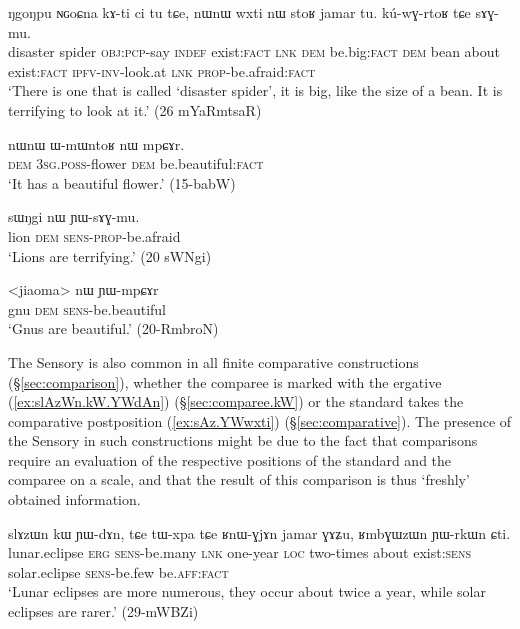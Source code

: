  \begin{exe}
\ex \label{ex:sAGmu}
\gll  ŋgoŋpu ɴɢoɕna kɤ-ti ci tu tɕe, nɯnɯ wxti nɯ stoʁ jamar tu. kú-wɣ-rtoʁ tɕe sɤɣ-mu. \\
disaster spider \textsc{obj}:\textsc{pcp}-say \textsc{indef} exist:\textsc{fact} \textsc{lnk} \textsc{dem} be.big:\textsc{fact}  \textsc{dem} bean about exist:\textsc{fact} \textsc{ipfv}-\textsc{inv}-look.at \textsc{lnk} \textsc{prop}-be.afraid:\textsc{fact} \\
\glt `There is one that is  called `disaster spider', it is big, like the size of a bean. It is terrifying to look at it.' (26 mYaRmtsaR)
\end{exe}


\begin{exe}
\ex \label{ex:mpCAr}
\gll nɯnɯ ɯ-mɯntoʁ nɯ mpɕɤr. \\
\textsc{dem} \textsc{3sg}.\textsc{poss}-flower \textsc{dem} be.beautiful:\textsc{fact} \\
\glt `It has a beautiful flower.' (15-babW) 
\end{exe}

\begin{exe}
	\ex \label{ex:YWsAGmu}
	\gll  sɯŋgi nɯ ɲɯ-sɤɣ-mu. \\
	lion \textsc{dem} \textsc{sens}-\textsc{prop}-be.afraid \\
	\glt `Lions are terrifying.' (20 sWNgi) 
\end{exe}
 
\begin{exe}
\ex \label{ex:YWmpCAr}
\gll <jiaoma> nɯ ɲɯ-mpɕɤr \\
gnu \textsc{dem} \textsc{sens}-be.beautiful \\
\glt `Gnus are beautiful.' (20-RmbroN) 
\end{exe}
 
The Sensory is also common in all finite comparative constructions (§\ref{sec:comparison}), whether the comparee is marked with the ergative (\ref{ex:slAzWn.kW.YWdAn}) (§\ref{sec:comparee.kW}) or the standard takes the comparative postposition (\ref{ex:sAz.YWwxti}) (§\ref{sec:comparative}). The presence of the Sensory in such constructions might be due to the fact that comparisons require an evaluation of the respective positions of the standard and the comparee on a scale, and that the result of this comparison is thus `freshly' obtained information.

\begin{exe}
\ex \label{ex:slAzWn.kW.YWdAn}
\gll slɤzɯn kɯ ɲɯ-dɤn, tɕe tɯ-xpa tɕe ʁnɯ-ɣjɤn jamar ɣɤʑu, ʁmbɣɯzɯn ɲɯ-rkɯn ɕti. \\
lunar.eclipse \textsc{erg} \textsc{sens}-be.many \textsc{lnk} one-year \textsc{loc} two-times about exist:\textsc{sens} solar.eclipse \textsc{sens}-be.few be.\textsc{aff}:\textsc{fact} \\
\glt `Lunar eclipses are more numerous, they occur about twice a year, while solar eclipses are rarer.' (29-mWBZi)
\end{exe}


